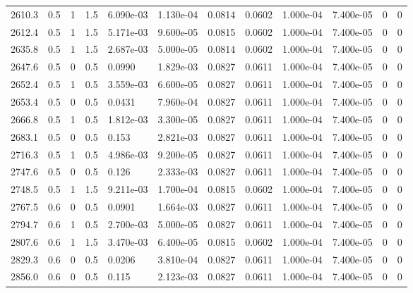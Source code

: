 \documentclass[preview]{standalone}
\begin{document}
{{{\begin{tabular}{L{1.2cm}C{1.2cm} C{0.3cm}C{0.5cm} C{1.4cm}C{1.4cm} C{1.4cm}C{1.4cm} C{1.6cm}C{1.6cm} C{1.6cm}C{1.6cm}}
  2610.3  &   0.5  & 1     & 1.5 &  6.090e-03  & 1.130e-04  &  0.0814&   0.0602& 1.000e-04 & 7.400e-05   &  0 & 0  \\ 
  2612.4  &   0.5  & 1     & 1.5 &  5.171e-03  & 9.600e-05  &  0.0815&   0.0602& 1.000e-04 & 7.400e-05   &  0 & 0  \\ 
  2635.8  &   0.5  & 1     & 1.5 &  2.687e-03  & 5.000e-05  &  0.0814&   0.0602& 1.000e-04 & 7.400e-05   &  0 & 0  \\ 
  2647.6  &   0.5  & 0     & 0.5 &  0.0990  & 1.829e-03  &  0.0827&   0.0611& 1.000e-04 & 7.400e-05   &  0 & 0  \\ 
  2652.4  &   0.5  & 1     & 0.5 &  3.559e-03  & 6.600e-05  &  0.0827&   0.0611& 1.000e-04 & 7.400e-05   &  0 & 0  \\ 
  2653.4  &   0.5  & 0     & 0.5 &  0.0431  & 7.960e-04  &  0.0827&   0.0611& 1.000e-04 & 7.400e-05   &  0 & 0  \\ 
  2666.8  &   0.5  & 1     & 0.5 &  1.812e-03  & 3.300e-05  &  0.0827&   0.0611& 1.000e-04 & 7.400e-05   &  0 & 0  \\ 
  2683.1  &   0.5  & 0     & 0.5 &  0.153  & 2.821e-03  &  0.0827&   0.0611& 1.000e-04 & 7.400e-05   &  0 & 0  \\ 
  2716.3  &   0.5  & 1     & 0.5 &  4.986e-03  & 9.200e-05  &  0.0827&   0.0611& 1.000e-04 & 7.400e-05   &  0 & 0  \\ 
  2747.6  &   0.5  & 0     & 0.5 &  0.126  & 2.333e-03  &  0.0827&   0.0611& 1.000e-04 & 7.400e-05   &  0 & 0  \\ 
  2748.5  &   0.5  & 1     & 1.5 &  9.211e-03  & 1.700e-04  &  0.0815&   0.0602& 1.000e-04 & 7.400e-05   &  0 & 0  \\ 
  2767.5  &   0.6  & 0     & 0.5 &  0.0901  & 1.664e-03  &  0.0827&   0.0611& 1.000e-04 & 7.400e-05   &  0 & 0  \\ 
  2794.7  &   0.6  & 1     & 0.5 &  2.700e-03  & 5.000e-05  &  0.0827&   0.0611& 1.000e-04 & 7.400e-05   &  0 & 0  \\ 
  2807.6  &   0.6  & 1     & 1.5 &  3.470e-03  & 6.400e-05  &  0.0815&   0.0602& 1.000e-04 & 7.400e-05   &  0 & 0  \\ 
  2829.3  &   0.6  & 0     & 0.5 &  0.0206  & 3.810e-04  &  0.0827&   0.0611& 1.000e-04 & 7.400e-05   &  0 & 0  \\ 
  2856.0  &   0.6  & 0     & 0.5 &  0.115  & 2.123e-03  &  0.0827&   0.0611& 1.000e-04 & 7.400e-05   &  0 & 0  \\ 
\hline 
\end{tabular} 

}}}
\end{document}
